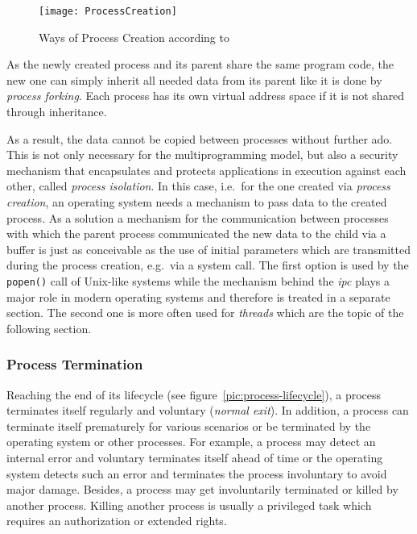 \begin{figure} [t]
	\centering
	\texttt{[image: ProcessCreation]}
	\caption{Ways of Process Creation according to~\cite{glatz2015betriebssysteme}}\label{pic:processcreation}
\end{figure}

As the newly created process and its parent share the same program code, the new one can simply inherit all needed data from its parent like it is done by \textit{process forking}\cite{achilles2006betriebssysteme}.
Each process has its own virtual address space if it is not shared through inheritance.

As a result, the data cannot be copied between processes without further ado.
This is not only necessary for the multiprogramming model, but also a security mechanism that encapsulates and protects applications in execution against each other, called \textit{process isolation}.
In this case, i.e.\ for the one created via \textit{process creation}, an operating system needs a mechanism to pass data to the created process.
As a solution a mechanism for the communication between processes with which the parent process communicated the new data to the child via a buffer is just as conceivable as the use of initial parameters which are transmitted during the process creation, e.g.\ via a system call\cite{glatz2015betriebssysteme}.
The first option is used by the \texttt{popen()} call of Unix-like systems while the mechanism behind the \textit{\ac{ipc}} plays a major role in modern operating systems and therefore is treated in a separate section.
The second one is more often used for \textit{threads} which are the topic of the following section.

\subsubsection*{Process Termination}
Reaching the end of its lifecycle (see figure~\ref{pic:process-lifecycle}), a process terminates itself regularly and voluntary (\textit{normal exit})\cite{tanenbaum-modern-operating-systems}.
In addition, a process can terminate itself prematurely for various scenarios or be terminated by the operating system or other processes.
For example, a process may detect an internal error and voluntary terminates itself ahead of time or the operating system detects such an error and terminates the process involuntary to avoid major damage\cite{tanenbaum-modern-operating-systems}.
Besides, a process may get involuntarily terminated or killed by another process. 
Killing another process is usually a privileged task which requires an authorization or extended rights\cite{tanenbaum-modern-operating-systems}.


